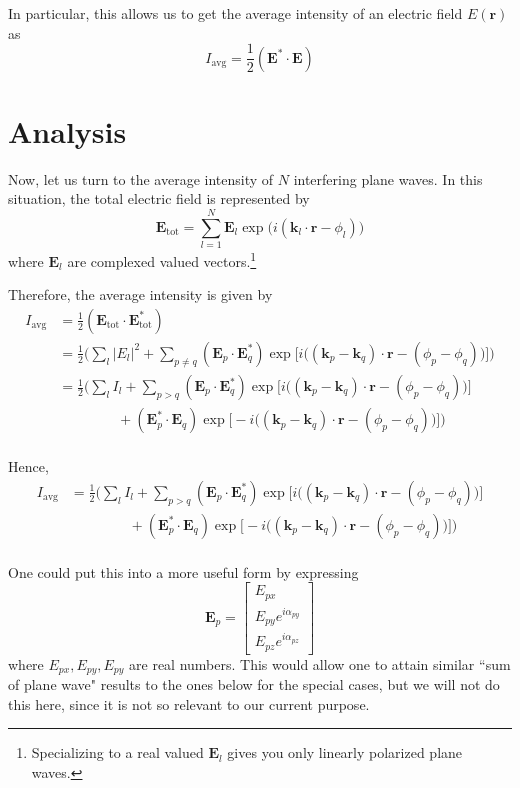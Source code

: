 \documentclass[11pt]{article}
\newcommand{\lef}{\left}
\newcommand{\rig}{\right}
\newcommand{\abs}[1]{\left| #1 \right|}
\newcommand{\threevec}[3]{\left[\begin{array}{c} #1\\ #2 \\ #3 \end{array}\right]}
\newcommand{\alp}{\alpha}
\newcommand{\ph}{\phi}
\newcommand{\vE}{\mathbf{E}}
\newcommand{\vk}{\mathbf{k}}
\newcommand{\vr}{\mathbf{r}}
\begin{document}
In particular, this allows us to get the average intensity of an electric field $E(\vr)$ as
\[
I_\text{avg} = \frac{1}{2}\lef( \vE^*\cdot\vE \rig)
\]

\section{Analysis}

Now, let us turn to the average intensity of $N$ interfering plane waves.  In this situation, the total electric field is represented by
\[
\vE_\text{tot} = \sum_{l=1}^{N} \vE_l \exp\Big(i(\vk_l \cdot \vr - \ph_l)\Big)
\]
where $\vE_l$ are complexed valued vectors.\footnote{Specializing to a real valued $\vE_l$ gives you only linearly polarized plane waves.}

Therefore, the average intensity is given by
\begin{equation*}
\begin{split}
I_\text{avg} &= \frac{1}{2} \lef( \vE_\text{tot} \cdot \vE_\text{tot}^* \rig) \\[1.5ex] 
&= \frac{1}{2} \Bigg( \sum_l \abs{E_l}^2 + \sum_{p \neq q} \lef(\vE_p\cdot \vE_q^*\rig) \exp\Big[i\Big((\vk_p-\vk_q) \cdot \vr - (\ph_p-\ph_q)\Big)\Big] \Bigg) \\[1.5ex] 
&= \frac{1}{2} \Bigg( \sum_l I_l + \sum_{p > q} \lef(\vE_p\cdot \vE_q^* \rig) \exp\Big[i\Big((\vk_p-\vk_q) \cdot \vr - (\ph_p-\ph_q)\Big)\Big]\\[1.5ex] 
& \ \ \ \ \ \ \ \ \ \ \ \ \ \ \ \ \ \ \ + \lef(\vE_p^*\cdot \vE_q \rig) \exp\Big[-i\Big((\vk_p-\vk_q) \cdot \vr - (\ph_p-\ph_q)\Big)\Big] \bigg) \\[1.5ex] 
\end{split}
\end{equation*}

Hence,
\begin{equation}
\begin{split}
I_\text{avg} &= \frac{1}{2} \Bigg( \sum_l I_l + \sum_{p > q} \lef(\vE_p\cdot \vE_q^* \rig) \exp\Big[i\Big((\vk_p-\vk_q) \cdot \vr - (\ph_p-\ph_q)\Big)\Big]\\[1.5ex] 
& \ \ \ \ \ \ \ \ \ \ \ \ \ \ \ \ \ \ \ + \lef(\vE_p^*\cdot \vE_q \rig) \exp\Big[-i\Big((\vk_p-\vk_q) \cdot \vr - (\ph_p-\ph_q)\Big)\Big] \bigg) \\[1.5ex]
\end{split}
\label{eq:genIavg}
\end{equation}

One could put this into a more useful form by expressing
\[
\vE_p = \threevec{E_{px}}{E_{py}e^{i\alp_{py}}}{E_{pz}e^{i\alp_{pz}}}
\]
where $E_{px},E_{py},E_{py}$ are real numbers.  This would allow one to attain similar ``sum of plane wave" results to the ones below for the special cases, but we will not do this here, since it is not so relevant to our current purpose.
\end{document}

